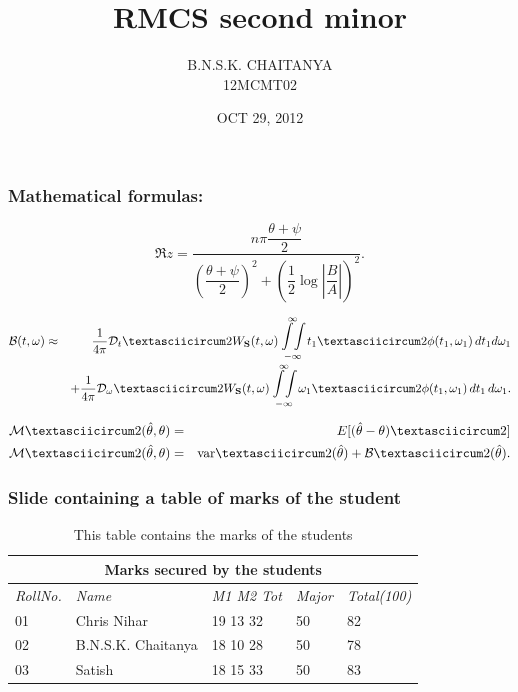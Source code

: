 \documentclass{beamer}
\title{RMCS second minor}
\author{B.N.S.K. CHAITANYA \\
12MCMT02 }
\date{OCT 29, 2012}
\begin{document}
\begin{frame}[plain]
 \titlepage
\end{frame}

\begin{frame}
\frametitle{Mathematical formulas:}
\begin{equation}
\Re{z} =\frac{n\pi \dfrac{\theta +\psi}{2}}{
\left(\dfrac{\theta +\psi}{2}\right)^2 + \left( \dfrac{1}{2}
\log \left\lvert\dfrac{B}{A}\right\rvert\right)^2}.
\end{equation}

\begin{eqnarray}
{\cal B}(t,\omega) & \approx &
{1 \over 4\pi}
{\cal D}_tˆ2 W_{\bf S}(t, \omega)
{{{\scriptstyle \infty} \atop
{\displaystyle \int \! \int \!
}}\atop {\scriptstyle -\infty}}
t_1ˆ2
\phi(t_1,\omega_1) \, dt_1 d\omega_1
\nonumber \\
&& +
{1 \over 4\pi}
{\cal D}_\omegaˆ2 W_{\bf S}(t, \omega)
{{{\scriptstyle \infty} \atop
{\displaystyle \int \! \int \!
}}\atop {\scriptstyle -\infty}}
\omega_1ˆ2
\phi(t_1,\omega_1) \, dt_1 \, d\omega_1.
\label{F4}
\end{eqnarray}

\begin{eqnarray}
{\cal M}ˆ2(\hat{\theta},\theta) &=& E[(\hat{\theta} - \theta)ˆ2]
\nonumber \\
{\cal M}ˆ2(\hat{\theta},\theta) &=& {\rm var}ˆ2(\hat{\theta}) +
{\cal B}ˆ2(\hat{\theta}).
\end{eqnarray}
\end{frame}

\begin{frame}
\frametitle{Slide containing a table of marks of the student}
\begin{table}[ht]
\centering
\begin{tabular}{|l|l|l|l|l|}
 \hline
 \multicolumn{5}{|c|}{\textbf{Marks secured by the students}} \\
 \hline
   \emph{RollNo.} & \emph{Name} & \emph{M1  M2  Tot} & \emph{Major} & \emph{Total(100)} \\ \hline
 \hline
01 & Chris Nihar & 19   13   32 & 50 & 82  \\ 
 \hline
02 & B.N.S.K. Chaitanya & 18  10  28 & 50 & 78   \\
\hline
03 & Satish & 18 15 33 & 50 & 83 \\
\hline
\end{tabular}
\caption{This table contains the marks of the students}
\label{tab:Marks of students}
\end{table}
\end{frame}
\end{document}
